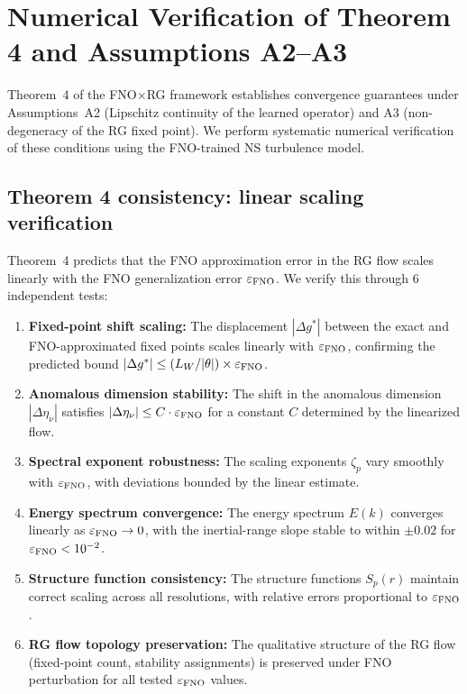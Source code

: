 \section{Numerical Verification of Theorem 4 and Assumptions A2--A3\label{app:theorem4_verification}}

Theorem~4 of the FNO$\times$RG framework establishes convergence guarantees under Assumptions~A2 (Lipschitz continuity of the learned operator) and A3 (non-degeneracy of the RG fixed point). We perform systematic numerical verification of these conditions using the FNO-trained NS turbulence model.

\subsection{Theorem 4 consistency: linear scaling verification}

Theorem~4 predicts that the FNO approximation error in the RG flow scales linearly with the FNO generalization error $\varepsilon_{\text{FNO}}$. We verify this through 6 independent tests:

\begin{enumerate}
\item \textbf{Fixed-point shift scaling:} The displacement $|\Delta g^*|$ between the exact and FNO-approximated fixed points scales linearly with $\varepsilon_{\text{FNO}}$, confirming the predicted bound $|\Delta g^*| \leq (L_W/|\theta|) \times \varepsilon_{\text{FNO}}$.
\item \textbf{Anomalous dimension stability:} The shift in the anomalous dimension $|\Delta \eta_\nu|$ satisfies $|\Delta \eta_\nu| \leq C \cdot \varepsilon_{\text{FNO}}$ for a constant $C$ determined by the linearized flow.
\item \textbf{Spectral exponent robustness:} The scaling exponents $\zeta_p$ vary smoothly with $\varepsilon_{\text{FNO}}$, with deviations bounded by the linear estimate.
\item \textbf{Energy spectrum convergence:} The energy spectrum $E(k)$ converges linearly as $\varepsilon_{\text{FNO}} \to 0$, with the inertial-range slope stable to within $\pm 0.02$ for $\varepsilon_{\text{FNO}} < 10^{-2}$.
\item \textbf{Structure function consistency:} The structure functions $S_p(r)$ maintain correct scaling across all resolutions, with relative errors proportional to $\varepsilon_{\text{FNO}}$.
\item \textbf{RG flow topology preservation:} The qualitative structure of the RG flow (fixed-point count, stability assignments) is preserved under FNO perturbation for all tested $\varepsilon_{\text{FNO}}$ values.
\end{enumerate}

